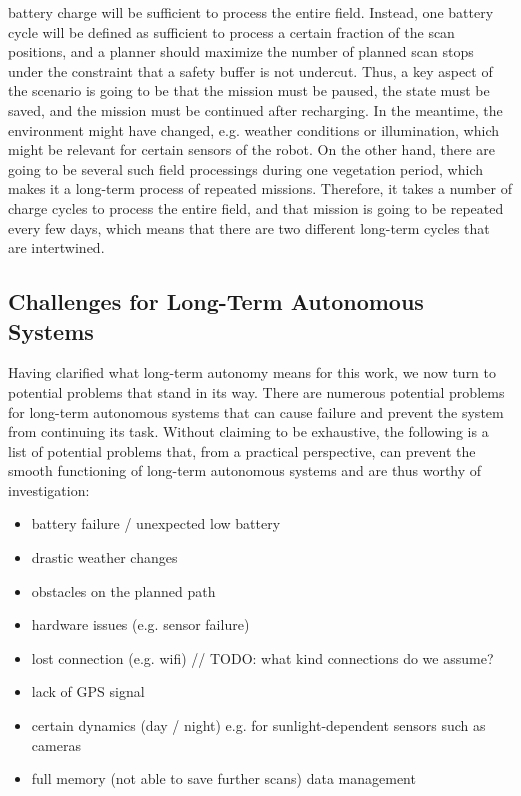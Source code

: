 \documentclass[english, master, expose, utf8]{base/thesis_KBS}
\begin{document}
battery charge will be sufficient to process the entire field. Instead, one battery cycle will be defined as sufficient to process a certain fraction of the scan
positions, and a planner should maximize the number of planned scan stops under the constraint that a safety buffer is not undercut.
Thus, a key aspect of the scenario is going to be that the mission must be paused, the state must be saved, and the mission must be continued after recharging.
In the meantime, the environment might have changed, e.g. weather conditions or illumination, which might be relevant for certain sensors of the robot.
On the other hand, there are going to be several such field processings during one vegetation period, which makes it a long-term process of repeated missions.
Therefore, it takes a number of charge cycles to process the entire field, and that mission is going to be repeated every few days,
which means that there are two different long-term cycles that are intertwined.\newline

\subsection{Challenges for Long-Term Autonomous Systems}
\label{sec:challenges_for_lta}

Having clarified what long-term autonomy means for this work, we now turn to potential problems that stand in its way.
There are numerous potential problems for long-term autonomous systems that can cause failure and prevent the system from continuing its task.
Without claiming to be exhaustive, the following is a list of potential problems that, from a practical perspective, can prevent the smooth functioning
of long-term autonomous systems and are thus worthy of investigation:
\begin{itemize}
    \item battery failure / unexpected low battery
    \item drastic weather changes
    \item obstacles on the planned path
    \item hardware issues (e.g. sensor failure)
    \item lost connection (e.g. wifi) // TODO: what kind connections do we assume?
    \item lack of GPS signal
    \item certain dynamics (day / night) e.g. for sunlight-dependent sensors such as cameras
    \item full memory (not able to save further scans) \textrightarrow data management
\end{itemize}
\end{document}
